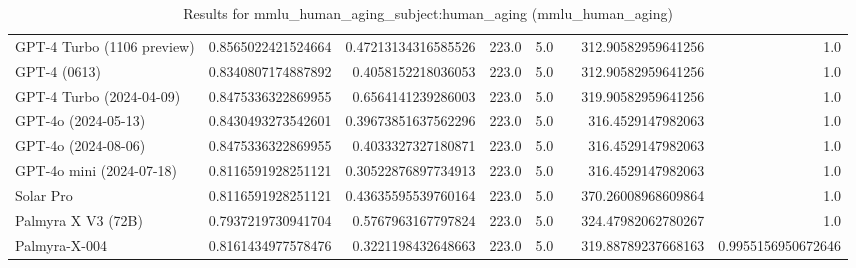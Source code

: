 \begin{table}[htp]
{\begin{tabular}{lrrrrrrr}
GPT-4 Turbo (1106 preview) & 0.8565022421524664 & 0.47213134316585526 & 223.0 & 5.0 &  & 312.90582959641256 & 1.0 \\
GPT-4 (0613) & 0.8340807174887892 & 0.4058152218036053 & 223.0 & 5.0 &  & 312.90582959641256 & 1.0 \\
GPT-4 Turbo (2024-04-09) & 0.8475336322869955 & 0.6564141239286003 & 223.0 & 5.0 &  & 319.90582959641256 & 1.0 \\
GPT-4o (2024-05-13) & 0.8430493273542601 & 0.39673851637562296 & 223.0 & 5.0 &  & 316.4529147982063 & 1.0 \\
GPT-4o (2024-08-06) & 0.8475336322869955 & 0.4033327327180871 & 223.0 & 5.0 &  & 316.4529147982063 & 1.0 \\
GPT-4o mini (2024-07-18) & 0.8116591928251121 & 0.30522876897734913 & 223.0 & 5.0 &  & 316.4529147982063 & 1.0 \\
Solar Pro & 0.8116591928251121 & 0.43635595539760164 & 223.0 & 5.0 &  & 370.26008968609864 & 1.0 \\
Palmyra X V3 (72B) & 0.7937219730941704 & 0.5767963167797824 & 223.0 & 5.0 &  & 324.47982062780267 & 1.0 \\
Palmyra-X-004 & 0.8161434977578476 & 0.3221198432648663 & 223.0 & 5.0 &  & 319.88789237668163 & 0.9955156950672646 \\
\bottomrule
\end{tabular}}
\caption{Results for mmlu_human_aging_subject:human_aging (mmlu_human_aging)}
\label{fig:mmlu_human_aging_subject:human_aging (mmlu_human_aging)}
\end{table}